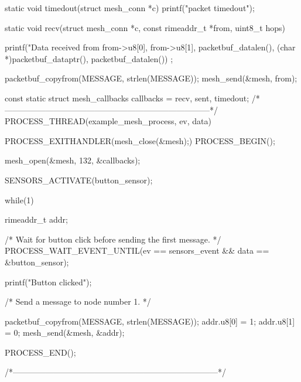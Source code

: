 \begin{DoxyCodeInclude}
static void
timedout(struct mesh_conn *c)
{
  printf("packet timedout\n");
}

static void
recv(struct mesh_conn *c, const rimeaddr_t *from, uint8_t hops)
{
  printf("Data received from %
         from->u8[0], from->u8[1],
         packetbuf_datalen(), (char *)packetbuf_dataptr(), packetbuf_datalen())
      ;

  packetbuf_copyfrom(MESSAGE, strlen(MESSAGE));
  mesh_send(&mesh, from);
}

const static struct mesh_callbacks callbacks = {recv, sent, timedout};
/*---------------------------------------------------------------------------*/
PROCESS_THREAD(example_mesh_process, ev, data)
{
  PROCESS_EXITHANDLER(mesh_close(&mesh);)
  PROCESS_BEGIN();

  mesh_open(&mesh, 132, &callbacks);

  SENSORS_ACTIVATE(button_sensor);

  while(1) {
    rimeaddr_t addr;

    /* Wait for button click before sending the first message. */
    PROCESS_WAIT_EVENT_UNTIL(ev == sensors_event && data == &button_sensor);

    printf("Button clicked\n");

    /* Send a message to node number 1. */
    
    packetbuf_copyfrom(MESSAGE, strlen(MESSAGE));
    addr.u8[0] = 1;
    addr.u8[1] = 0;
    mesh_send(&mesh, &addr);
  }
  PROCESS_END();
}
/*---------------------------------------------------------------------------*/
\end{DoxyCodeInclude}
 